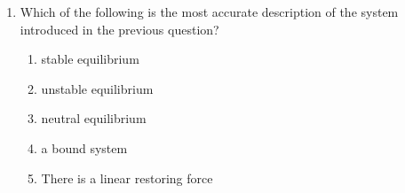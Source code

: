 \documentclass{../../../oss-apphys}
\begin{document}
\begin{multicols}{2}
\begin{enumerate}[resume,leftmargin=18pt]
  \item Which of the following is the most accurate description of the system
    introduced in the previous question?
    \label{q:well2}
    \begin{enumerate}[noitemsep,topsep=0pt,leftmargin=18pt,label=(\Alph*)]
    \item stable equilibrium
    \item unstable equilibrium
    \item neutral equilibrium
    \item a bound system
    \item There is a linear restoring force
    \end{enumerate}
  
    \columnbreak
    

\end{enumerate}
\end{multicols}
\end{document}

